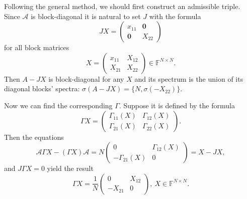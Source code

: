 \documentclass[14pt,a4paper]{extarticle}
\theoremstyle{definition}
\begin{document}
Following the general method,
    we should first construct an admissible triple.
Since \( \mathcal{A} \) is block-diagonal
    it is natural to set \( J \) with the formula
    \[
        JX =
        \left(\begin{array}{c|c}
            x_{11} & \mathbf{0} \\ \hline
            \mathbf{0} & X_{22}
        \end{array}\right)
    \]
    for all block matrices
    \[
        X =
        \left(\begin{array}{c|c}
            x_{11} & X_{12} \\ \hline
            X_{21} & X_{22}
        \end{array}\right)\in\mathbb{F}^{N{\times}N}.
    \]
Then \( A - JX \) is block-diagonal for any \( X \)
    and its spectrum is the union
    of its diagonal blocks' spectra:
    \( \sigma(A - JX) = \{N, \sigma(-X_{22}) \} \).

Now we can find the corresponding \( \Gamma \).
Suppose it is defined by the formula
    \[ \Gamma X = \begin{pmatrix}
        \Gamma_{11}(X) & \Gamma_{12}(X) \\
        \Gamma_{21}(X) & \Gamma_{22}(X)
        \end{pmatrix}.
    \]
Then the equations
    \[
        \mathcal{A} \Gamma X - (\Gamma X)\mathcal{A} =
        N
        \begin{pmatrix}
          0 & \Gamma_{12}(X) \\
          -\Gamma_{21}(X) & 0
        \end{pmatrix} = X - JX,
     \]
and \( J\Gamma X = 0 \) yield the result
    \[
        \Gamma X = \frac{1}{N} \begin{pmatrix} 0 & X_{12} \\ -X_{21} & 0 \end{pmatrix},\ X\in\mathbb{F}^{N{\times}N}.
    \]
\end{document}
